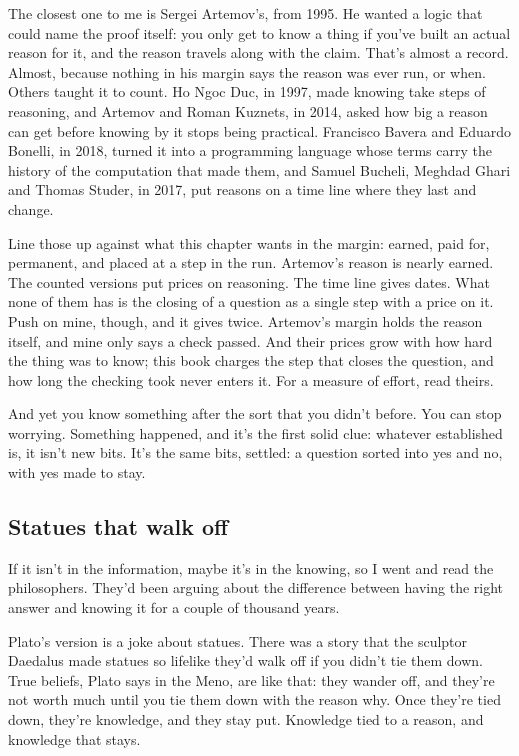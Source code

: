 \documentclass[11pt,twoside]{article}
\theoremstyle{thielethm}
\theoremstyle{thieledef}
\theoremstyle{thieledef}
\theoremstyle{thieledef}
\theoremstyle{thielethm}
\theoremstyle{thieleobs}
\theoremstyle{thielethm}
\begin{document}
The closest one to me is Sergei Artemov's, from 1995. He wanted a logic that could name the proof itself: you only get to know a thing if you've built an actual reason for it, and the reason travels along with the claim. That's almost a record. Almost, because nothing in his margin says the reason was ever run, or when. Others taught it to count. Ho Ngoc Duc, in 1997, made knowing take steps of reasoning, and Artemov and Roman Kuznets, in 2014, asked how big a reason can get before knowing by it stops being practical. Francisco Bavera and Eduardo Bonelli, in 2018, turned it into a programming language whose terms carry the history of the computation that made them, and Samuel Bucheli, Meghdad Ghari and Thomas Studer, in 2017, put reasons on a time line where they last and change.

Line those up against what this chapter wants in the margin: earned, paid for, permanent, and placed at a step in the run. Artemov's reason is nearly earned. The counted versions put prices on reasoning. The time line gives dates. What none of them has is the closing of a question as a single step with a price on it. Push on mine, though, and it gives twice. Artemov's margin holds the reason itself, and mine only says a check passed. And their prices grow with how hard the thing was to know; this book charges the step that closes the question, and how long the checking took never enters it. For a measure of effort, read theirs.

And yet you know something after the sort that you didn't before. You can stop worrying. Something happened, and it's the first solid clue: whatever established is, it isn't new bits. It's the same bits, settled: a question sorted into yes and no, with yes made to stay.

\subsection{Statues that walk off}

If it isn't in the information, maybe it's in the knowing, so I went and read the philosophers. They'd been arguing about the difference between having the right answer and knowing it for a couple of thousand years.

Plato's version is a joke about statues. There was a story that the sculptor Daedalus made statues so lifelike they'd walk off if you didn't tie them down. True beliefs, Plato says in the Meno, are like that: they wander off, and they're not worth much until you tie them down with the reason why. Once they're tied down, they're knowledge, and they stay put. Knowledge tied to a reason, and knowledge that stays.
\end{document}

